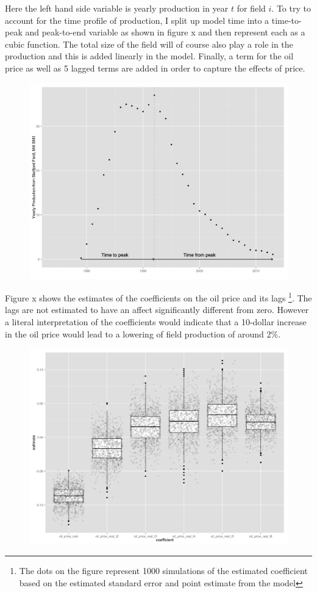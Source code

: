\documentclass[12pt]{scrartcl} %
\begin{document}
Here the left hand side variable is yearly production in year $t$ for field $i$.  To try to account for the time profile of production, I split up model time into a time-to-peak and peak-to-end variable as shown in figure x and then represent each as a cubic function.  The total size of the field will of course also play a role in the production and this is added linearly in the model.  Finally, a term for the oil price as well as 5 lagged terms are added in order to capture the effects of price.  

\begin{figure}
\includegraphics[width=.8\textwidth]{statfjord_dem.png}
\end{figure}

Figure x shows the estimates of the coefficients on the oil price and its lags \footnote{The dots on the figure represent 1000 simulations of the estimated coefficient based on the estimated standard error and point estimate from the model}.  The lags are not estimated to have an affect significantly different from zero. However a literal interpretation of the coefficients would indicate that a 10-dollar increase in the oil price would lead to a lowering of field production of around 2\%.

\begin{figure}
\includegraphics[width=.8\textwidth]{glm_dirty_box.png}
\end{figure}
\end{document}
